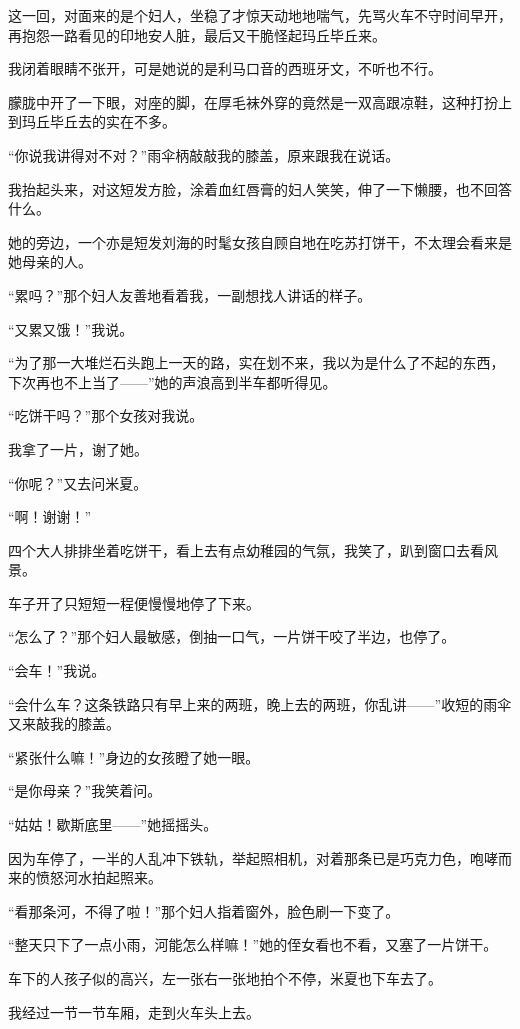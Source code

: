 \par 这一回，对面来的是个妇人，坐稳了才惊天动地地喘气，先骂火车不守时间早开，再抱怨一路看见的印地安人脏，最后又干脆怪起玛丘毕丘来。
\par 我闭着眼睛不张开，可是她说的是利马口音的西班牙文，不听也不行。
\par 朦胧中开了一下眼，对座的脚，在厚毛袜外穿的竟然是一双高跟凉鞋，这种打扮上到玛丘毕丘去的实在不多。
\par “你说我讲得对不对？”雨伞柄敲敲我的膝盖，原来跟我在说话。
\par 我抬起头来，对这短发方脸，涂着血红唇膏的妇人笑笑，伸了一下懒腰，也不回答什么。
\par 她的旁边，一个亦是短发刘海的时髦女孩自顾自地在吃苏打饼干，不太理会看来是她母亲的人。
\par “累吗？”那个妇人友善地看着我，一副想找人讲话的样子。
\par “又累又饿！”我说。
\par “为了那一大堆烂石头跑上一天的路，实在划不来，我以为是什么了不起的东西，下次再也不上当了——”她的声浪高到半车都听得见。
\par “吃饼干吗？”那个女孩对我说。
\par 我拿了一片，谢了她。
\par “你呢？”又去问米夏。
\par “啊！谢谢！”
\par 四个大人排排坐着吃饼干，看上去有点幼稚园的气氛，我笑了，趴到窗口去看风景。
\par 车子开了只短短一程便慢慢地停了下来。
\par “怎么了？”那个妇人最敏感，倒抽一口气，一片饼干咬了半边，也停了。
\par “会车！”我说。
\par “会什么车？这条铁路只有早上来的两班，晚上去的两班，你乱讲——”收短的雨伞又来敲我的膝盖。
\par “紧张什么嘛！”身边的女孩瞪了她一眼。
\par “是你母亲？”我笑着问。
\par “姑姑！歇斯底里——”她摇摇头。
\par 因为车停了，一半的人乱冲下铁轨，举起照相机，对着那条已是巧克力色，咆哮而来的愤怒河水拍起照来。
\par “看那条河，不得了啦！”那个妇人指着窗外，脸色刷一下变了。
\par “整天只下了一点小雨，河能怎么样嘛！”她的侄女看也不看，又塞了一片饼干。
\par 车下的人孩子似的高兴，左一张右一张地拍个不停，米夏也下车去了。
\par 我经过一节一节车厢，走到火车头上去。
